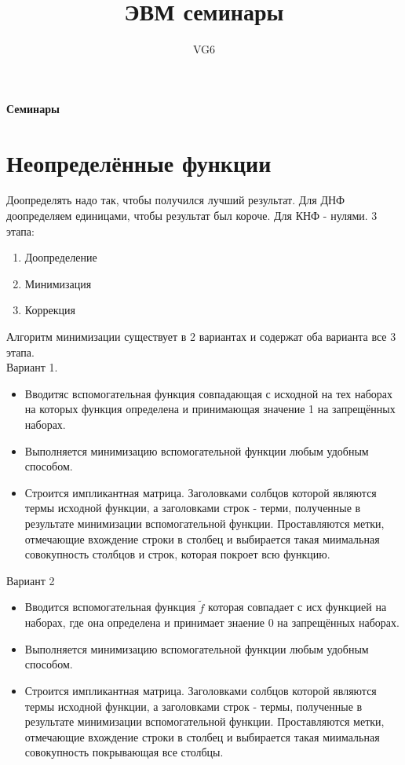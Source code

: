 \documentclass[12px]{article}
\title{ЭВМ семинары}
\author{VG6}
\begin{document}
\begin{center}
	\textbf{Семинары}
\end{center}

\section{Неопределённые функции}
Доопределять надо так, чтобы получился лучший результат. Для ДНФ доопределяем единицами, чтобы результат был короче. Для КНФ - нулями.
3 этапа:
\begin{enumerate}
	\item Доопределение
	\item Минимизация
	\item Коррекция		
\end{enumerate}

Алгоритм минимизации существует в 2 вариантах и содержат оба варианта все 3 этапа.\\
Вариант 1. 
\begin{itemize}
	\item Вводитяс вспомогательная функция  совпадающая с исходной на тех наборах на которых функция определена и принимающая значение 1 на запрещённых наборах.
	\item Выполняется минимизацию вспомогательной функции любым удобным способом.
	\item Строится импликантная матрица. Заголовками солбцов которой являются термы исходной функции, а заголовками строк - терми, полученные в результате минимизации вспомогательной функции. Проставляются метки, отмечающие вхождение строки в столбец и выбирается такая миимальная совокупность столбцов и строк, которая покроет всю функцию.
\end{itemize}
Вариант 2
\begin{itemize}
	\item Вводится вспомогательная функция $\tilde{f}$ которая совпадает с исх функцией на наборах, где она определена и принимает знаение 0 на запрещённых наборах.
	\item Выполняется минимизацию вспомогательной функции любым удобным способом.
	\item Строится импликантная матрица. Заголовками солбцов которой являются термы исходной функции, а заголовками строк - термы, полученные в результате минимизации вспомогательной функции. Проставляются метки, отмечающие вхождение строки в столбец и выбирается такая миимальная совокупность покрывающая все столбцы.
\end{itemize}
\end{document}
